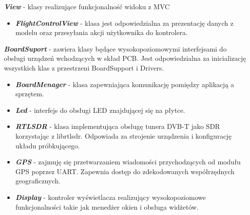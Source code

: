 \documentclass[eng,printmode]{mgr}
\begin{document}
\noindent
\textbf{\textit{View}} - klasy realizujące funkcjonalność widoku z MVC
\begin{itemize}[label={}]
  \item \textbf{\textit{FlightControlView}} - klasa jest odpowiedzialna za prezentację danych z modelu oraz przesyłania akcji użytkownika do kontrolera.
\end{itemize}
\vskip 0.55cm

\noindent
\textbf{\textit{BoardSuport}} - zawiera klasy będące wysokopoziomowymi interfejsami do obsługi urządzeń wchodzących w skład PCB. Jest odpowiedzialna za inicializację wszystkich klas z przestrzeni BoardSupport i Drivers.
\begin{itemize}[label={}]
  \item \textbf{\textit{BoardMenager}} - klasa zapewniająca komunikację pomiędzy aplikacją a sprzętem.
  \item \textbf{\textit{Led}} - interfejs do obsługi LED znajdującej się na płytce.
  \item \textbf{\textit{RTLSDR}} - klasa implementująca obsługę tunera DVB-T jako SDR korzystając z librtlsdr. Odpowiada za strojenie urządzenia i konfigurację układu próbkującego. 
  \item \textbf{\textit{GPS}} - zajmuję się przetwarzaniem wiadomości przychodzących od modułu GPS poprzez UART. Zapewnia dostęp do zdekodowanych współrzędnych geograficznych.
  \item \textbf{\textit{Display}} - kontroler wyświetlacza realizujący wysokopoziomowe funkcjonalności takie jak menedżer okien i obsługa widżetów.
\end{itemize}
\vskip 0.55cm
\end{document}
